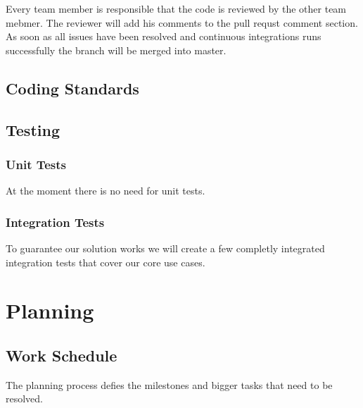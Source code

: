 Every team member is responsible that the code is reviewed by the other
team mebmer. The reviewer will add his comments to the pull requst
comment section. As soon as all issues have been resolved and continuous
integrations runs successfully the branch will be merged into master.

\subsection{Coding Standards}\label{coding-standards}

\subsection{Testing}\label{testing}

\subsubsection{Unit Tests}\label{unit-tests}

At the moment there is no need for unit tests.

\subsubsection{Integration Tests}\label{integration-tests}

To guarantee our solution works we will create a few completly
integrated integration tests that cover our core use cases.

\section{Planning}\label{planning}

\subsection{Work Schedule}\label{work-schedule}

The planning process defies the milestones and bigger tasks that need to
be resolved.